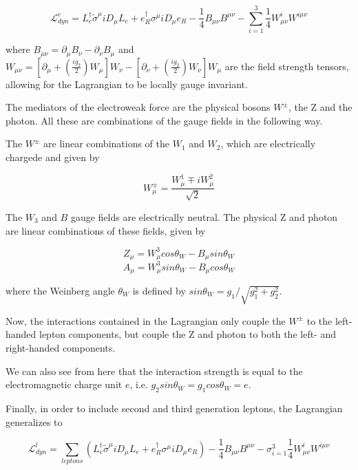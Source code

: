  \begin{equation}
 \mathcal{L}^{e}_{dyn} = L_{e}^{\dagger}\tilde{\sigma}^{\mu}iD_{\mu}L_{e}+e_{R}^{\dagger}\sigma^{\mu}iD_{\mu}e_{R} - \frac{1}{4}B_{\mu\nu}B^{\mu\nu}- \sum_{i=1}^{3}\frac{1}{4}W_{\mu\nu}^{i}W^{i\mu\nu}
 \end{equation}

 where $B_{\mu\nu}=\partial_{\mu}B_{\nu}-\partial_{\nu}B_{\mu}$ and $W_{\mu\nu} = [\partial_{\mu}+(\frac{ig_{2}}{2})W_{\mu}]W_{\nu} - [\partial_{\nu}+(\frac{ig_{2}}{2})W_{\nu}]W_{\mu}$ are the field strength tensors, allowing for the Lagrangian to be locally gauge invariant.

 The mediators of the electroweak force are the physical bosons $W^{\pm}$, the Z and the photon. All these are combinations of the gauge fields in the following way. 

 The $W^{\pm}$ are linear combinations of the $W_{1}$ and $W_{2}$, which are electrically chargede and given by

 \begin{equation}
W_{\mu}^{\pm} = \frac{W_{\mu}^{1}\mp i W_{\mu}^{2}}{\sqrt{2}}
 \end{equation}

The $W_{3}$ and $B$ gauge fields are electrically neutral. The physical Z and photon are linear combinations of these fields, given by

\begin{equation}
Z_{\mu} = W_{\mu}^{3}cos\theta_{W} - B_{\mu}sin\theta_{W}
\end{equation}
\begin{equation}
A_{\mu} = W_{\mu}^{3}sin\theta_{W} - B_{\mu}cos\theta_{W}
\end{equation}

where the Weinberg angle $\theta_{W}$ is defined by $sin\theta_{W}= g_{1}/\sqrt{g_{1}^{2}+g_{2}^{2}}$.

Now, the interactions contained in the Lagrangian only couple the $W^{\pm}$ to the left-handed lepton components, but couple the Z and photon to both the left- and right-handed components. 

We can also see from here that the interaction strength is equal to the electromagnetic charge unit $e$, i.e. $g_{2}sin\theta_{W}=g_{1}cos\theta_{W}=e$.

Finally, in order to include second and third generation leptons, the Lagrangian generalizes to 

\begin{equation}
\mathcal{L}^{l}_{dyn} = \sum_{leptons}(L_{e}^{\dagger}\tilde{\sigma}^{\mu}iD_{\mu}L_{e}+e_{R}^{\dagger}\sigma^{\mu}iD_{\mu}e_{R}) - \frac{1}{4}B_{\mu\nu}B^{\mu\nu}- \sigma_{i=1}^{3}\frac{1}{4}W_{\mu\nu}^{i}W^{i\mu\nu}
\end{equation}


